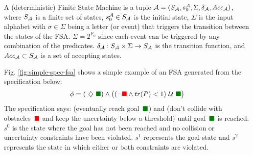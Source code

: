 \documentclass[letterpaper]{article} %
\newcommand{\sofie}[1]{{\color{purple} [Sofie] #1}}
\begin{document}
\begin{definition}
A (deterministic) Finite State Machine is a tuple $\mathcal{A} = (S_{\mathcal{A}}, s_0^{\mathcal{A}}, \Sigma, \delta_{\mathcal{A}}, Acc_{\mathcal{A}})$, where %
$S_{\mathcal{A}}$ is a finite set of states, $s_0^{\mathcal{A}} \in S_{\mathcal{A}}$ is the initial state,
$\Sigma$ is the input alphabet with $\sigma\in\Sigma$ being a letter (or event) that triggers the transition between the states of the FSA. $\Sigma = 2^{F_\phi}$ since each event can be triggered by any combination of the predicates.
$\delta_{\mathcal{A}} : S_{\mathcal{A}} \times \Sigma \rightarrow S_{\mathcal{A}}$ is the transition function, and
$Acc_{\mathcal{A}}\subset S_{\mathcal{A}}$ is a set of accepting states.
\end{definition}

\newcommand{\goal}{{\color{green!50!black}\blacksquare}}
\newcommand{\obst}{{\color{red}\blacksquare}}


Fig. \ref{fig:simple-spec-fsa} shows a simple example of an FSA generated from the \DTL specification below:
\begin{align}
\label{eq:simple-spec}
\phi = (\Event \goal) \land \big((\neg \obst \land tr(P) < 1) \Until \goal \big)
\end{align}
The specification says: (eventually reach goal~$\goal$) and (don't collide with obstacles~$\obst$ and keep the uncertainty below a threshold) until goal~$\goal$ is reached. $s^0$ is the state where the goal has not been reached and no collision or uncertainty constraints have been violated. $s^1$ represents the goal state and $s^2$ represents the state in which either or both constraints are violated.
\end{document}
